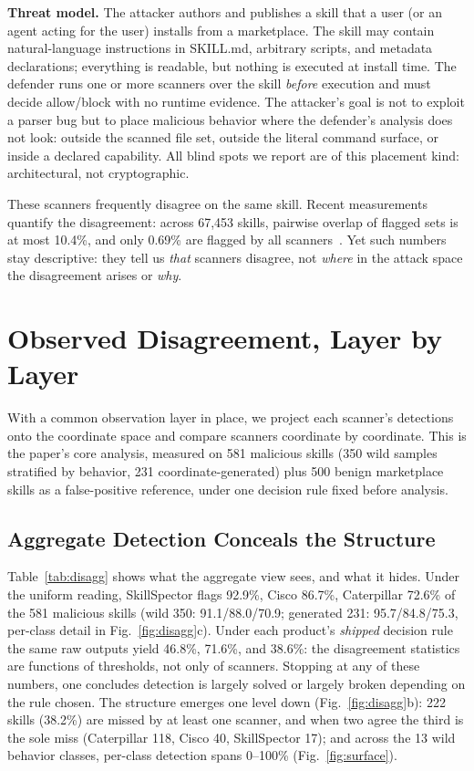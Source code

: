 \documentclass[sigconf,nonacm]{acmart}
\begin{document}
\textbf{Threat model.} The attacker authors and publishes a skill that a user (or an agent acting for the user) installs from a marketplace. The skill may contain natural-language instructions in SKILL.md, arbitrary scripts, and metadata declarations; everything is readable, but nothing is executed at install time. The defender runs one or more scanners over the skill \emph{before} execution and must decide allow/block with no runtime evidence. The attacker's goal is not to exploit a parser bug but to place malicious behavior where the defender's analysis does not look: outside the scanned file set, outside the literal command surface, or inside a declared capability. All blind spots we report are of this placement kind: architectural, not cryptographic.

These scanners frequently disagree on the same skill. Recent measurements quantify the disagreement: across 67{,}453 skills, pairwise overlap of flagged sets is at most 10.4\%, and only 0.69\% are flagged by all scanners~\cite{clawhub2026}. Yet such numbers stay descriptive: they tell us \emph{that} scanners disagree, not \emph{where} in the attack space the disagreement arises or \emph{why}.

\section{Observed Disagreement, Layer by Layer}
\label{sec:explain}

With a common observation layer in place, we project each scanner's detections onto the coordinate space and compare scanners coordinate by coordinate. This is the paper's core analysis, measured on 581 malicious skills (350 wild samples stratified by behavior, 231 coordinate-generated) plus 500 benign marketplace skills as a false-positive reference, under one decision rule fixed before analysis.

\subsection{Aggregate Detection Conceals the Structure}
Table~\ref{tab:disagg} shows what the aggregate view sees, and what it hides. Under the uniform reading, SkillSpector flags 92.9\%, Cisco 86.7\%, Caterpillar 72.6\% of the 581 malicious skills (wild 350: 91.1/88.0/70.9; generated 231: 95.7/84.8/75.3, per-class detail in Fig.~\ref{fig:disagg}c). Under each product's \emph{shipped} decision rule the same raw outputs yield 46.8\%, 71.6\%, and 38.6\%: the disagreement statistics are functions of thresholds, not only of scanners. Stopping at any of these numbers, one concludes detection is largely solved or largely broken depending on the rule chosen. The structure emerges one level down (Fig.~\ref{fig:disagg}b): 222 skills (38.2\%) are missed by at least one scanner, and when two agree the third is the sole miss (Caterpillar 118, Cisco 40, SkillSpector 17); and across the 13 wild behavior classes, per-class detection spans 0--100\% (Fig.~\ref{fig:surface}).
\end{document}
